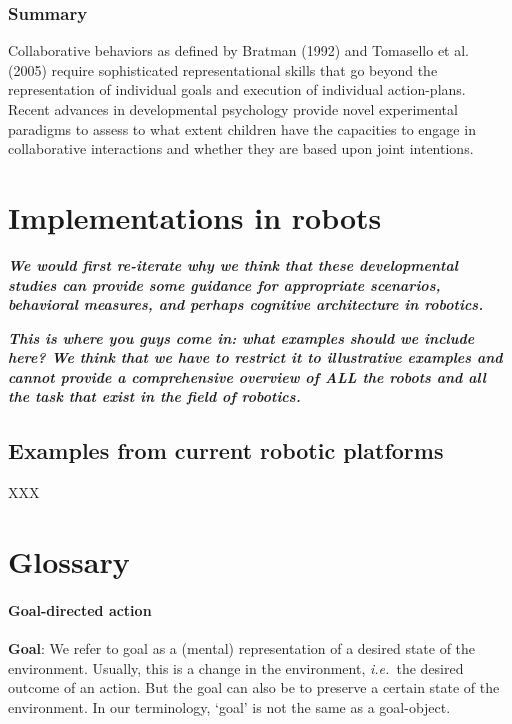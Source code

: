 \documentclass{article}
\newcommand{\ie}{{\textit{i.e.~}}}
\begin{document}
\subsubsection{Summary}

Collaborative behaviors as defined by Bratman (1992) and Tomasello et al.
(2005) require sophisticated representational skills that go beyond the
representation of individual goals and execution of individual action-plans.
Recent advances in developmental psychology provide novel experimental
paradigms to assess to what extent children have the capacities to engage in
collaborative interactions and whether they are based upon joint intentions. 

\section{Implementations in robots}

{\bfseries\itshape We would first re-iterate why we think that these
developmental studies can provide some guidance for appropriate scenarios,
behavioral measures, and perhaps cognitive architecture in robotics.}

{\bfseries\itshape This is where you guys come in: what examples should we
include here? We think that we have to restrict it to illustrative examples and
cannot provide a comprehensive overview of ALL the robots and all the task that
exist in the field of robotics.}

\subsection{Examples from current robotic platforms}

XXX

\section{Glossary}

\paragraph{Goal-directed action}

\textbf{Goal}: We refer to goal as a (mental) representation of a desired state
of the environment. Usually, this is a change in the environment, \ie the
desired outcome of an action. But the goal can also be to preserve a certain
state of the environment. In our terminology, `goal{}' is not the same as a
goal-object. 
\end{document}
